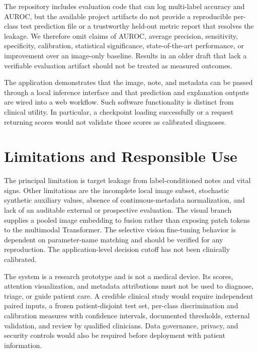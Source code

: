 \documentclass[conference]{IEEEtran}
\begin{document}
The repository includes evaluation code that can log multi-label accuracy and AUROC, but the available project artifacts do not provide a reproducible per-class test prediction file or a trustworthy held-out metric report that resolves the leakage. We therefore omit claims of AUROC, average precision, sensitivity, specificity, calibration, statistical significance, state-of-the-art performance, or improvement over an image-only baseline. Results in an older draft that lack a verifiable evaluation artifact should not be treated as measured outcomes.

The application demonstrates that the image, note, and metadata can be passed through a local inference interface and that prediction and explanation outputs are wired into a web workflow. Such software functionality is distinct from clinical utility. In particular, a checkpoint loading successfully or a request returning scores would not validate those scores as calibrated diagnoses.

\section{Limitations and Responsible Use}
The principal limitation is target leakage from label-conditioned notes and vital signs. Other limitations are the incomplete local image subset, stochastic synthetic auxiliary values, absence of continuous-metadata normalization, and lack of an auditable external or prospective evaluation. The visual branch supplies a pooled image embedding to fusion rather than exposing patch tokens to the multimodal Transformer. The selective vision fine-tuning behavior is dependent on parameter-name matching and should be verified for any reproduction. The application-level decision cutoff has not been clinically calibrated.

The system is a research prototype and is not a medical device. Its scores, attention visualization, and metadata attributions must not be used to diagnose, triage, or guide patient care. A credible clinical study would require independent paired inputs, a frozen patient-disjoint test set, per-class discrimination and calibration measures with confidence intervals, documented thresholds, external validation, and review by qualified clinicians. Data governance, privacy, and security controls would also be required before deployment with patient information.
\end{document}
